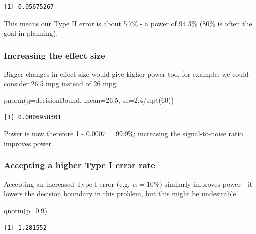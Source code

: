 \documentclass[
  oneside]{krantz}
\newenvironment{Shaded}{\begin{snugshade}}{\end{snugshade}}
\newcommand{\AttributeTok}[1]{\textcolor[rgb]{0.77,0.63,0.00}{#1}}
\newcommand{\DecValTok}[1]{\textcolor[rgb]{0.00,0.00,0.81}{#1}}
\newcommand{\FloatTok}[1]{\textcolor[rgb]{0.00,0.00,0.81}{#1}}
\newcommand{\FunctionTok}[1]{\textcolor[rgb]{0.00,0.00,0.00}{#1}}
\newcommand{\NormalTok}[1]{#1}
\newcommand{\SpecialCharTok}[1]{\textcolor[rgb]{0.00,0.00,0.00}{#1}}
\begin{document}
\begin{verbatim}
[1] 0.05675267
\end{verbatim}

This means our Type II error is about 5.7\% - a power of 94.3\% (80\% is often the goal in planning).

\hypertarget{increasing-the-effect-size}{%
\subsubsection{Increasing the effect size}\label{increasing-the-effect-size}}

Bigger changes in effect size would give higher power too, for example, we could consider 26.5 mpg instead of 26 mpg:

\begin{Shaded}
\begin{Highlighting}[]
\FunctionTok{pnorm}\NormalTok{(}\AttributeTok{q=}\NormalTok{decisionBound, }\AttributeTok{mean=}\FloatTok{26.5}\NormalTok{, }\AttributeTok{sd=}\FloatTok{2.4}\SpecialCharTok{/}\FunctionTok{sqrt}\NormalTok{(}\DecValTok{60}\NormalTok{))}
\end{Highlighting}
\end{Shaded}

\begin{verbatim}
[1] 0.0006958301
\end{verbatim}

Power is now therefore 1 - 0.0007 = 99.9\%; increasing the signal-to-noise ratio improves power.

\hypertarget{accepting-a-higher-type-i-error-rate}{%
\subsubsection{Accepting a higher Type I error rate}\label{accepting-a-higher-type-i-error-rate}}

Accepting an increased Type I error (e.g.~\(\alpha=10\%\)) similarly improves power - it lowers the decision boundary in this problem, but this might be undesirable.

\begin{Shaded}
\begin{Highlighting}[]
\FunctionTok{qnorm}\NormalTok{(}\AttributeTok{p=}\FloatTok{0.9}\NormalTok{)}
\end{Highlighting}
\end{Shaded}

\begin{verbatim}
[1] 1.281552
\end{verbatim}
\end{document}
